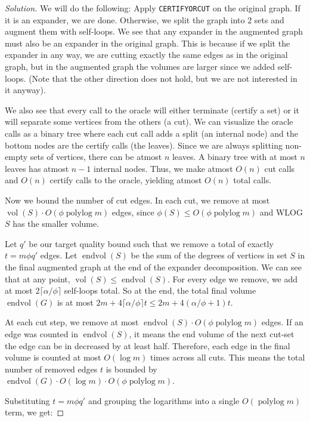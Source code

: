 \documentclass[a4paper,11pt]{article}
\DeclareMathOperator{\polylog}{polylog}
\DeclareMathOperator{\vol}{vol}
\DeclareMathOperator{\evol}{endvol}
\newenvironment{solution}
  {\begin{proof}[Solution]}
  {\end{proof}}
\begin{document}
\begin{solution}

We will do the following: Apply \texttt{CERTIFYORCUT} on the original graph. If it is an expander, we are done. Otherwise, we split the graph into $2$ sets and augment them with self-loops. We see that any expander in the augmented graph must also be an expander in the original graph. This is because if we split the expander in any way, we are cutting exactly the same edges as in the original graph, but in the augmented graph the volumes are larger since we added self-loops. (Note that the other direction does not hold, but we are not interested in it anyway).

We also see that every call to the oracle will either terminate (certify a set) or it will separate some vertices from the others (a cut). We can visualize the oracle calls as a binary tree where each cut call adds a split (an internal node) and the bottom nodes are the certify calls (the leaves). Since we are always splitting non-empty sets of vertices, there can be atmost $n$ leaves. A binary tree with at most $n$ leaves has atmost $n-1$ internal nodes. Thus, we make atmost $O(n)$ cut calls and $O(n)$ certify calls to the oracle, yielding atmost $O(n)$ total calls.

Now we bound the number of cut edges. In each cut, we remove at most $\vol(S) \cdot O(\phi \polylog m)$ edges, since $\phi(S) \leq O(\phi \polylog m)$ and WLOG $S$ has the smaller volume.

Let $q'$ be our target quality bound such that we remove a total of exactly $t = m \phi q'$ edges. Let $\evol(S)$ be the sum of the degrees of vertices in set $S$ in the final augmented graph at the end of the expander decomposition. We can see that at any point, $\vol(S) \leq \evol(S)$. For every edge we remove, we add at most $2\lceil \alpha/\phi \rceil$ self-loops total. So at the end, the total final volume $\evol(G)$ is at most $2m + 4\lceil \alpha/\phi \rceil t \leq 2m + 4(\alpha/\phi + 1)t$.

At each cut step, we remove at most $\evol(S) \cdot O(\phi \polylog m)$ edges. If an edge was counted in $\evol(S)$, it means the end volume of the next cut-set the edge can be in decreased by at least half. Therefore, each edge in the final volume is counted at most $O(\log m)$ times across all cuts. This means the total number of removed edges $t$ is bounded by $\evol(G) \cdot O(\log m) \cdot O(\phi \polylog m)$.

Substituting $t = m \phi q'$ and grouping the logarithms into a single $O(\polylog m)$ term, we get:


\end{solution}
\end{document}
